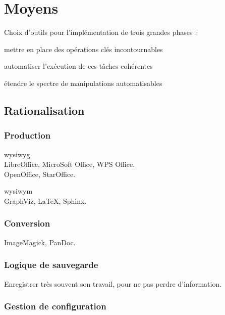 \section{Moyens}

Choix d’outils pour l’implémentation de trois grandes phases :

\begin{itmz}
\item{mettre en place des opérations clés incontournables}
\item{automatiser l’exécution de ces tâches cohérentes}
\item{étendre le spectre de manipulations automatisables}
\end{itmz}

\hr

\subsection{Rationalisation}

\subsubsection{Production}

\gls{wysiwyg}\\
LibreOffice, MicroSoft Office, WPS Office.\\
OpenOffice, StarOffice.

\gls{wysiwym}\\
GraphViz, \LaTeX, Sphinx.

\subsubsection{Conversion}

ImageMagick, PanDoc.

\subsubsection{Logique de sauvegarde}

Enregistrer très souvent son travail, pour ne pas perdre d’information.

\subsubsection{Gestion de configuration}

